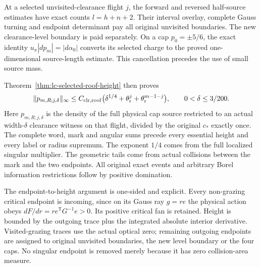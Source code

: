 At a selected unvisited-clearance flight $j$, the forward and
reversed half-source estimates have exact counts
$l=h+n+2$. Their interval overlay, complete Gauss turning and
endpoint determinant pay all original unvisited boundaries.
The new clearance-level boundary is paid separately. On a cap
$p_0=\pm5/6$, the exact identity
$u_x|dp_m|=|d\alpha_0|$ converts its selected charge to the
proved one-dimensional source-length estimate. This cancellation
precedes the use of small source mass.

Theorem~\ref{thm:lc-selected-roof-height} then proves
\begin{equation}\label{eq:intro-selected-roof}
 \|p_{m,R;j,\delta}\|_\infty
 \le C_{\rm clr,roof}
       \bigl(\delta^{1/4}+\theta_{\rm r}^{j}
                         +\theta_{\rm r}^{m-1-j}\bigr),
 \qquad 0<\delta\le3/200.
\end{equation}
Here $p_{m,R;j,\delta}$ is the density of the full physical cap
source restricted to an actual width-$\delta$ clearance witness
on that flight, divided by the original $c_*$ exactly once.
The complete word, mark and angular sums precede every essential
height and every label or radius supremum. The exponent $1/4$
comes from the full localized singular multiplier. The geometric
tails come from actual collisions between the mark and the two
endpoints. All original exact events and arbitrary Borel
information restrictions follow by positive domination.

The endpoint-to-height argument is one-sided and explicit.
Every non-grazing critical endpoint is incoming, since on its
Gauss ray $g=re$ the physical action obeys
$dF/dr=r e^{\mathsf T}G^{-1}e>0$.
Its positive critical fan is retained. Height is bounded by the
outgoing trace plus the integrated absolute interior derivative.
Visited-grazing traces use the actual optical zero; remaining
outgoing endpoints are assigned to original unvisited boundaries,
the new level boundary or the four caps. No singular endpoint
is removed merely because it has zero collision-area measure.

